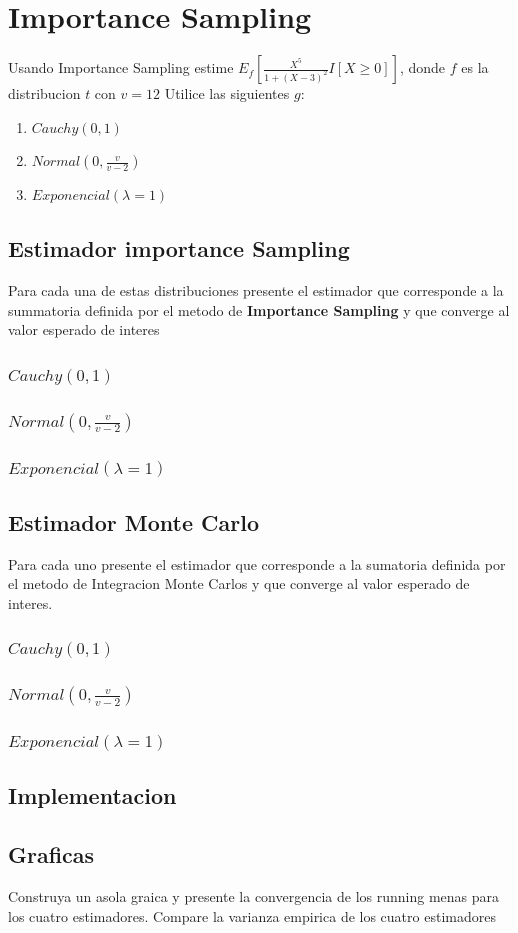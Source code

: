 \documentclass{article}
\begin{document}
\section{Importance Sampling}

Usando Importance Sampling estime $E_f\left[ \frac{X^5}{1+(X - 3)^2}I[X \ge 0] \right]$, donde $f$ es la
distribucion $t$ con $v=12$ Utilice las siguientes $g$:
\begin{enumerate}
	\item $Cauchy(0,1)$
	\item $Normal(0, \frac{v}{v-2})$
	\item $Exponencial(\lambda=1)$
\end{enumerate}

\subsection{Estimador importance Sampling}
Para cada una de estas distribuciones presente el estimador que corresponde a la summatoria definida
por el metodo de \textbf{Importance Sampling} y que converge al valor esperado de interes
\subsubsection{$Cauchy(0,1)$}
\subsubsection{$Normal(0, \frac{v}{v-2})$}
\subsubsection{$Exponencial(\lambda=1)$}

\subsection{Estimador Monte Carlo}
Para cada uno presente el estimador que corresponde a la sumatoria definida por el metodo de Integracion
Monte Carlos y que converge al valor esperado de interes.
\subsubsection{$Cauchy(0,1)$}
\subsubsection{$Normal(0, \frac{v}{v-2})$}
\subsubsection{$Exponencial(\lambda=1)$}

\subsection{Implementacion}

\subsection{Graficas}
Construya un asola graica y presente la convergencia de los running menas para los cuatro estimadores. Compare la varianza empirica de los
cuatro estimadores
\end{document}
